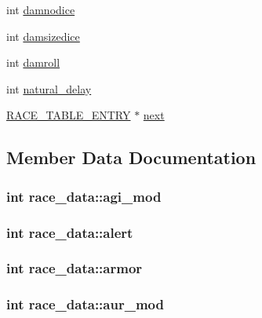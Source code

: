 \begin{DoxyCompactItemize}
\item 
int \hyperlink{structrace__data_a24175f6bde6122ac599912bf9fb27311}{damnodice}
\item 
int \hyperlink{structrace__data_ad339f9ee861ea35a312e03815c04faae}{damsizedice}
\item 
int \hyperlink{structrace__data_ad55979edf381b7ef1c68a0474dbb012a}{damroll}
\item 
int \hyperlink{structrace__data_aa66a491ce4b1d0643a8437932791f7fb}{natural\-\_\-delay}
\item 
\hyperlink{structs_8h_a80a16874fb7cfcb03a38218a0cdb90c1}{R\-A\-C\-E\-\_\-\-T\-A\-B\-L\-E\-\_\-\-E\-N\-T\-R\-Y} $\ast$ \hyperlink{structrace__data_a3b592ad13ca9a4120dbb6cef934de5c5}{next}
\end{DoxyCompactItemize}


\subsection{Member Data Documentation}
\hypertarget{structrace__data_a09bb642b42556523af54ac47af20a036}{
\subsubsection[{agi\-\_\-mod}]{\setlength{\rightskip}{0pt plus 5cm}int race\-\_\-data\-::agi\-\_\-mod}}\label{structrace__data_a09bb642b42556523af54ac47af20a036}
\hypertarget{structrace__data_a621752ac0b5eb4383c78d9f53ec9ae30}{
\subsubsection[{alert}]{\setlength{\rightskip}{0pt plus 5cm}int race\-\_\-data\-::alert}}\label{structrace__data_a621752ac0b5eb4383c78d9f53ec9ae30}
\hypertarget{structrace__data_ab8154a5bdf47b222816d3ed3f2282762}{
\subsubsection[{armor}]{\setlength{\rightskip}{0pt plus 5cm}int race\-\_\-data\-::armor}}\label{structrace__data_ab8154a5bdf47b222816d3ed3f2282762}
\hypertarget{structrace__data_a1fd816c3fb08aaa56c7715591dd4e7fd}{
\subsubsection[{aur\-\_\-mod}]{\setlength{\rightskip}{0pt plus 5cm}int race\-\_\-data\-::aur\-\_\-mod}}\label{structrace__data_a1fd816c3fb08aaa56c7715591dd4e7fd}
